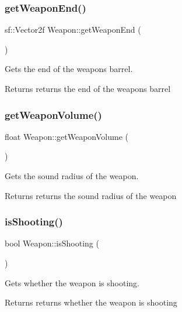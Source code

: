 \subsubsection{\texorpdfstring{get\+Weapon\+End()}{getWeaponEnd()}}
{\footnotesize\ttfamily sf\+::\+Vector2f Weapon\+::get\+Weapon\+End (\begin{DoxyParamCaption}{ }\end{DoxyParamCaption})}



Gets the end of the weapons barrel. 

\begin{DoxyReturn}{Returns}
returns the end of the weapons barrel 
\end{DoxyReturn}
\mbox{\label{class_weapon_a35778cd30d27e461e601cefce101c680}} 
\subsubsection{\texorpdfstring{get\+Weapon\+Volume()}{getWeaponVolume()}}
{\footnotesize\ttfamily float Weapon\+::get\+Weapon\+Volume (\begin{DoxyParamCaption}{ }\end{DoxyParamCaption})}



Gets the sound radius of the weapon. 

\begin{DoxyReturn}{Returns}
returns the sound radius of the weapon 
\end{DoxyReturn}
\mbox{\label{class_weapon_a50f8c0a7b18e6ef0aa01c2d076561148}} 
\subsubsection{\texorpdfstring{is\+Shooting()}{isShooting()}}
{\footnotesize\ttfamily bool Weapon\+::is\+Shooting (\begin{DoxyParamCaption}{ }\end{DoxyParamCaption})}



Gets whether the weapon is shooting. 

\begin{DoxyReturn}{Returns}
returns whether the weapon is shooting 
\end{DoxyReturn}
\mbox{\label{class_weapon_ab81bbc103829e1abc5e898b583c6d179}} 
